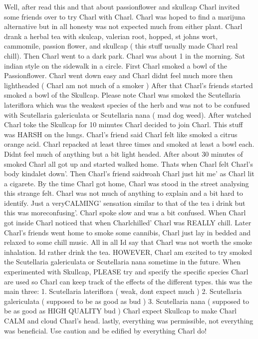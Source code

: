 \documentclass[12pt]{book}
\begin{document}
Well, after read this and that about passionflower and skullcap Charl invited some friends over to try Charl with Charl. Charl was hoped to find a marijuna alternative but in all honesty was not expected much from either plant. Charl drank a herbal tea with skulcap, valerian root, hopped, st johns wort, cammomile, passion flower, and skullcap ( this stuff usually made Charl real chill). Then Charl went to a dark park. Charl was about 1 in the morning. Sat indian style on the sidewalk in a circle. First Charl smoked a bowl of the Passionflower. Charl went down easy and Charl didnt feel much more then lightheaded ( Charl am not much of a smoker ) After that Charl's friends started smoked a bowl of the Skullcap. Please note Charl was smoked the Scutellaria lateriflora which was the weakest species of the herb and was not to be confused with Scutellaria galericulata or Scutellaria nana ( mad dog weed). After watched Charl toke the Skullcap for 10 minutes Charl decided to join Charl. This stuff was HARSH on the lungs. Charl's friend said Charl felt like smoked a citrus orange acid. Charl repacked at least three times and smoked at least a bowl each. Didnt feel much of anything but a bit light headed. After about 30 minutes of smoked Charl all got up and started walked home. Thats when Charl felt Charl's body kindalet down'. Then Charl's friend saidwoah Charl just hit me' as Charl lit a cigarete. By the time Charl got home, Charl was stood in the street analysing this strange felt. Charl was not much of anything to explain and a bit hard to identify. Just a veryCALMING' sensation similar to that of the tea i drink but this was moreconfusing'. Charl spoke slow and was a bit confused. When Charl got inside Charl noticed that when Charlchilled' Charl was REALLY chill. Later Charl's friends went home to smoke some cannibis, Charl just lay in bedded and relaxed to some chill music. All in all Id say that Charl was not worth the smoke inhalation. Id rather drink the tea. HOWEVER, Charl am excited to try smoked the Scutellaria galericulata or Scutellaria nana sometime in the future. When experimented with Skullcap, PLEASE try and specify the specific species Charl are used so Charl can keep track of the effects of the different types. this was the main three: 1. Scutellaria lateriflora ( weak, dont expect much ) 2. Scutellaria galericulata ( supposed to be as good as bud ) 3. Scutellaria nana ( supposed to be as good as HIGH QUALITY bud ) Charl expect Skullcap to make Charl CALM and cloud Charl's head. lastly, everything was permissible, not everything was beneficial. Use caution and be edified by everything Charl do!
\end{document}
